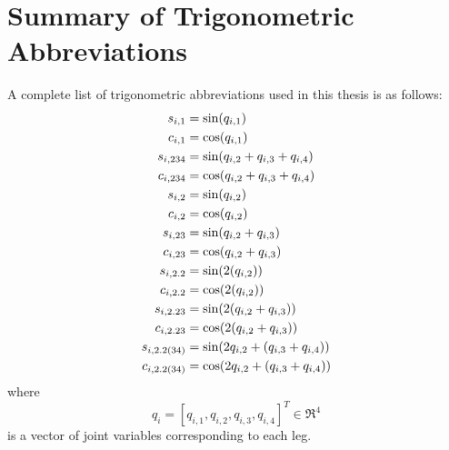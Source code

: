 \chapter{Summary of Trigonometric Abbreviations}
	\label{appendix::e}

	\noindent
	A complete list of trigonometric abbreviations used in this thesis is as follows:
		\begin{equation*}
			\begin{split}\small
				s_{i,1} 	&= \sin(q_{i,1})					\\
				c_{i,1} 	&= \cos(q_{i,1})					\\
				s_{i,234} 	&= \sin(q_{i,2}+q_{i,3}+q_{i,4})	\\
				c_{i,234} 	&= \cos(q_{i,2}+q_{i,3}+q_{i,4})	\\
				s_{i,2} 	&= \sin(q_{i,2})					\\
				c_{i,2} 	&= \cos(q_{i,2})					\\
				s_{i,23} 	&= \sin(q_{i,2}+q_{i,3})			\\
				c_{i,23} 	&= \cos(q_{i,2}+q_{i,3})			\\
				s_{i,2.2} 	&= \sin(2(q_{i,2}))					\\
				c_{i,2.2} 	&= \cos(2(q_{i,2}))					\\
				s_{i,2.23} 	&= \sin(2(q_{i,2}+q_{i,3}))			\\
				c_{i,2.23} 	&= \cos(2(q_{i,2}+q_{i,3}))			\\
				s_{i,2.2(34)}&= \sin(2q_{i,2}+(q_{i,3}+q_{i,4}))	\\
				c_{i,2.2(34)}&= \cos(2q_{i,2}+(q_{i,3}+q_{i,4}))	\\
			\end{split}
		\end{equation*}
	where 
		\begin{equation*}
			q_{i} = [q_{i,1},q_{i,2},q_{i,3},q_{i,4}]^{T} \in \Re^{4} 
		\end{equation*}
	is a vector of joint variables corresponding to each \Ith leg.